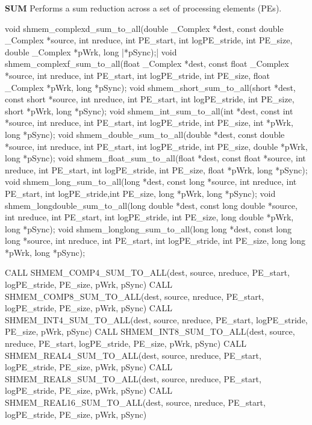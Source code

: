 \begin{apidefinition}
\bigskip
\textbf{SUM} \newline
Performs a sum reduction across a set of processing elements (\acp{PE}).\newline
\begin{Csynopsis}
void shmem_complexd_sum_to_all(double _Complex *dest, const double _Complex *source, int nreduce, int PE_start, int logPE_stride, int PE_size, double _Complex *pWrk, long |\mbox{*pSync);}|
void shmem_complexf_sum_to_all(float _Complex *dest, const float _Complex *source, int nreduce, int PE_start, int logPE_stride, int PE_size, float _Complex *pWrk, long *pSync);
void shmem_short_sum_to_all(short *dest, const short *source, int nreduce, int PE_start, int logPE_stride, int PE_size, short *pWrk, long *pSync);
void shmem_int_sum_to_all(int *dest, const int *source, int nreduce, int PE_start, int logPE_stride, int PE_size, int *pWrk, long *pSync);
void shmem_double_sum_to_all(double *dest, const double *source, int nreduce, int PE_start, int logPE_stride, int PE_size, double *pWrk, long *pSync);
void shmem_float_sum_to_all(float *dest, const float *source, int nreduce, int PE_start, int logPE_stride, int PE_size, float *pWrk, long *pSync);
void shmem_long_sum_to_all(long *dest, const long *source, int nreduce, int PE_start, int logPE_stride,int PE_size, long *pWrk, long *pSync);
void shmem_longdouble_sum_to_all(long double *dest, const long double *source, int nreduce, int PE_start, int logPE_stride, int PE_size, long double *pWrk, long *pSync);
void shmem_longlong_sum_to_all(long long *dest, const long long *source, int nreduce, int PE_start, int logPE_stride, int PE_size, long long *pWrk, long *pSync);
\end{Csynopsis}

\begin{Fsynopsis}
CALL SHMEM_COMP4_SUM_TO_ALL(dest, source, nreduce, PE_start, logPE_stride, PE_size, pWrk, pSync)
CALL SHMEM_COMP8_SUM_TO_ALL(dest, source, nreduce, PE_start, logPE_stride, PE_size, pWrk, pSync)
CALL SHMEM_INT4_SUM_TO_ALL(dest, source, nreduce, PE_start, logPE_stride, PE_size, pWrk, pSync)
CALL SHMEM_INT8_SUM_TO_ALL(dest, source, nreduce, PE_start, logPE_stride, PE_size, pWrk, pSync)
CALL SHMEM_REAL4_SUM_TO_ALL(dest, source, nreduce, PE_start, logPE_stride, PE_size, pWrk, pSync)
CALL SHMEM_REAL8_SUM_TO_ALL(dest, source, nreduce, PE_start, logPE_stride, PE_size, pWrk, pSync)
CALL SHMEM_REAL16_SUM_TO_ALL(dest, source, nreduce, PE_start, logPE_stride, PE_size, pWrk, pSync)
\end{Fsynopsis}


\end{apidefinition}
